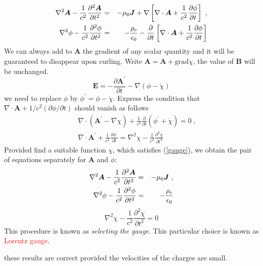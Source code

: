 \documentclass[12pt,a4paper]{article}
\renewcommand{\vec}[1]{\boldsymbol{#1}}
\begin{document}
\begin{eqnarray*}
\nabla^2 \vec{A} -\frac{1}{c^2} \frac{\partial^2 \vec{A} }{\partial t^2} &=& -\mu_0 \vec{J} + \nabla\left[\nabla \cdot \vec{A} +\frac{1}{c^2} \frac{\partial \phi }{\partial t} \right] ~,\\
\nabla^2 \phi -\frac{1}{c^2} \frac{\partial^2 \phi }{\partial t^2} &=& -\frac{\rho_{\rm e}}{\epsilon_0} - \frac{\partial}{\partial t}\left[\nabla \cdot \vec{A} +\frac{1}{c^2} \frac{\partial \phi }{\partial t} \right] 
\end{eqnarray*}
We can always add to $\vec{A}$ the gradient of any scalar quantity and it will be guaranteed to disappear upon curling. Write $\vec{A} = \vec{A} + \text{grad} \chi$, the value of $\vec{B}$ will be unchanged. 
\begin{equation}
\vec{E} = -\frac{\partial \vec{A}^{\prime} }{\partial t} -\nabla(\phi -\dot{\chi})
\end{equation}
we need to replace $\phi$ by $\phi^{\prime} = \phi − \dot{\chi}$. Express the condition that
$\nabla \cdot \vec{A} +1/c^2 (\partial \phi/\partial t)$ should vanish as follows
\begin{eqnarray}
\nonumber &&\nabla \cdot (\vec{A}^{\prime} -\nabla \chi) + \frac{1}{c^2}\frac{\partial}{\partial t} (\phi^{\prime} +\dot{\chi}) = 0 ~, \\
 &&\nabla \cdot \vec{A}^{\prime} +\frac{1}{c^2}\frac{\partial \phi^{\prime} }{\partial t} = \nabla^2 \chi -\frac{1}{c^2} \frac{\partial^2 \chi }{\partial t^2} \label{gauge}
\end{eqnarray}
Provided find a suitable function $\chi$, which satisfies (\ref{gauge}), we obtain the pair of equations separately for $\vec{A}$ and $\phi$:
\begin{eqnarray}
\nabla^2 \vec{A} -\frac{1}{c^2} \frac{\partial^2 \vec{A} }{\partial t^2} &=& -\mu_0 \vec{J} ~,\\
\nabla^2 \phi -\frac{1}{c^2} \frac{\partial^2 \phi }{\partial t^2} &=& -\frac{\rho_{\rm e}}{\epsilon_0} \end{eqnarray}
\begin{equation}
\nabla^2 \chi -\frac{1}{c^2} \frac{\partial^2 \chi }{\partial t^2} \label{gauge} = 0
\end{equation}
This procedure is known as \emph{selecting the gauge}. This particular choice is known as \textcolor{red}{Lorentz gauge}.



these results are correct provided the velocities of the charges are small. 
\end{document}
